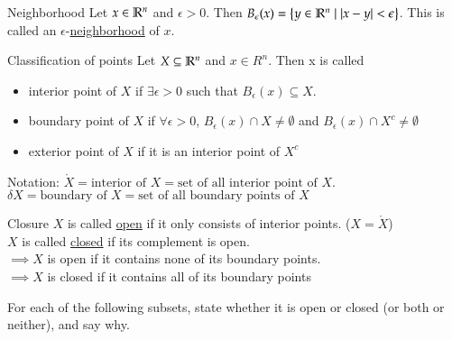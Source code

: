 

\begin{defn}{Neighborhood}
  Let $x\in \mathbb{R}^n$ and $\epsilon > 0$. Then $B_\epsilon (x) = \left\{ y\in \mathbb{R}^n \mid |x-y|<\epsilon \right\}$. This is called an $\epsilon$-\ul{neighborhood} of $x$.
\end{defn}
\begin{defn}{Classification of points}
  Let $X\subseteq \mathbb{R}^n$ and $x\in R^n$. Then x is called
  \begin{itemize}
    \item interior point of $X$ if $\exists \epsilon > 0$ such that $B_\epsilon (x) \subseteq X$.
    \item boundary point of $X$ if $\forall \epsilon > 0$, $B_\epsilon (x) \cap X \neq \emptyset$ and $B_\epsilon (x) \cap X^c \neq \emptyset$
    \item exterior point of $X$ if it is an interior point of $X^c$
  \end{itemize}
  Notation: $\mathring{X} = \text{interior of }X = \text{set of all interior point of }X$.
  $\delta X = \text{boundary of }X = \text{set of all boundary points of }X$
\end{defn}
\begin{defn}{Closure}
  $X$ is called \ul{open} if it only consists of interior points. ($X=\mathring{X}$) \\
  $X$ is called \ul{closed} if its complement is open. \\
  $\implies X$ is open if it contains none of its boundary points. \\
  $\implies X$ is closed if it contains all of its boundary points \\
\end{defn}

For each of the following subsets, state whether it is open or closed (or both or neither), and say why.

